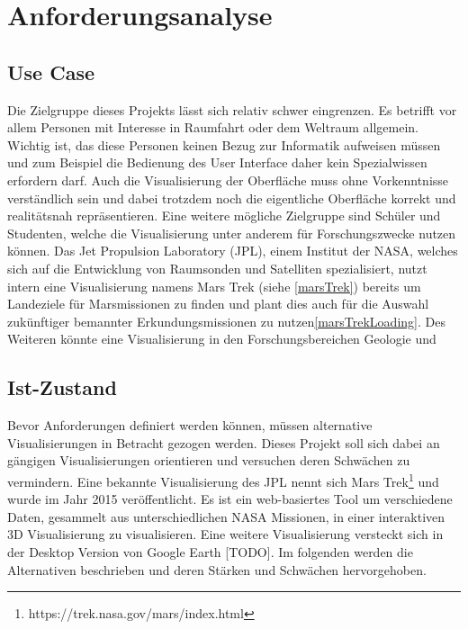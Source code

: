 \chapter{Anforderungsanalyse}

\section{Use Case}
Die Zielgruppe dieses Projekts lässt sich relativ schwer eingrenzen. Es betrifft vor allem Personen mit Interesse in Raumfahrt oder dem Weltraum allgemein. Wichtig ist, das diese Personen keinen Bezug zur Informatik aufweisen müssen und zum Beispiel die Bedienung des User Interface daher kein Spezialwissen erfordern darf. Auch die Visualisierung der Oberfläche muss ohne Vorkenntnisse verständlich sein und dabei trotzdem noch die eigentliche Oberfläche korrekt und realitätsnah repräsentieren. Eine weitere mögliche Zielgruppe sind Schüler und Studenten, welche die Visualisierung unter anderem für Forschungszwecke nutzen können. Das Jet Propulsion Laboratory (JPL), einem Institut der NASA, welches sich auf die Entwicklung von Raumsonden und Satelliten spezialisiert, nutzt intern eine Visualisierung namens Mars Trek (siehe \ref{marsTrek}) bereits um Landeziele für Marsmissionen zu finden und plant dies auch für die Auswahl zukünftiger bemannter Erkundungsmissionen zu nutzen\ref{marsTrekLoading}. Des Weiteren könnte eine Visualisierung in den Forschungsbereichen Geologie und 

\section{Ist-Zustand}\label{istZustand}
Bevor Anforderungen definiert werden können, müssen alternative Visualisierungen in Betracht gezogen werden. Dieses Projekt soll sich dabei an gängigen Visualisierungen orientieren und versuchen deren Schwächen zu vermindern. Eine bekannte Visualisierung des JPL nennt sich Mars Trek\footnote{https://trek.nasa.gov/mars/index.html} und wurde im Jahr 2015 veröffentlicht. Es ist ein web-basiertes Tool um verschiedene Daten, gesammelt aus unterschiedlichen NASA Missionen, in einer interaktiven 3D Visualisierung zu visualisieren. Eine weitere Visualisierung versteckt sich in der Desktop Version von Google Earth [TODO]. Im folgenden werden die Alternativen beschrieben und deren Stärken und Schwächen hervorgehoben.

